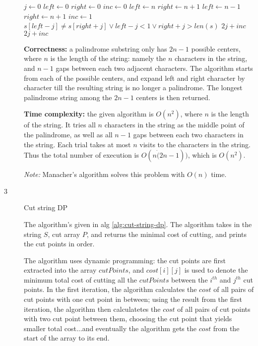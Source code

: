 \documentclass{article}
\begin{document}
\begin{description}
\begin{algorithm}[H]
\begin{algorithmic}[1]
      \State $j \gets 0$
      \State $left \gets 0$
      \State $right \gets 0$
      \State $inc \gets 0$
        \State $left \gets n$
        \State $right \gets n+1$
        \State $left \gets n-1$
        \State $right \gets n+1$
        \State $inc \gets 1$
      \EndIf
        \If $s[left - j] \neq s[right + j] \vee left - j < 1 \vee right + j > len(s)$
          \Return $2j + inc$
        \EndIf
      \EndFor
      \State \Return $2j + inc$
    \EndFunction

    \end{algorithmic}
  \end{algorithm}

  \textbf{Correctness:} a palindrome substring only has $2n - 1$ possible centers, where $n$ is the length of the string: namely the $n$ characters in the string, and $n-1$ gaps between each two adjacent characters. The algorithm starts from each of the possible centers, and expand left and right character by character till the resulting string is no longer a palindrome. The longest palindrome string among the $2n - 1$ centers is then returned. 

  \textbf{Time complexity:} the given algorithm is $O(n^2)$, where $n$ is the length of the string. It tries all $n$ characters in the string as the middle point of the palindrome, as well as all $n-1$ gaps between each two characters in the string. Each trial takes at most $n$ visits to the characters in the string. Thus the total number of execution is $O(n \dot (2n - 1))$, which is $O(n^2)$.

  \textit{Note:} Manacher's algorithm solves this problem with $O(n)$ time.

\item[3]{Cut string DP}

  The algorithm's given in alg \ref{alg:cut-string-dp}. The algorithm takes in the string $S$, cut array $P$, and returns the minimal cost of cutting, and prints the cut points in order.

  The algorithm uses dynamic programming: the cut points are first extracted into the array $cutPoints$, and $cost[i][j]$ is used to denote the minimum total cost of cutting all the $cutPoints$ between the $i^{th}$ and $j^{th}$ cut points. In the first iteration, the algorithm calculates the $cost$ of all pairs of cut points with one cut point in between; using the result from the first iteration, the algorithm then calculatetes the $cost$ of all pairs of cut points with two cut point between them, choosing the cut point that yields smaller total cost...and eventually the algorithm gets the $cost$ from the start of the array to its end.


\end{description}
\end{document}
